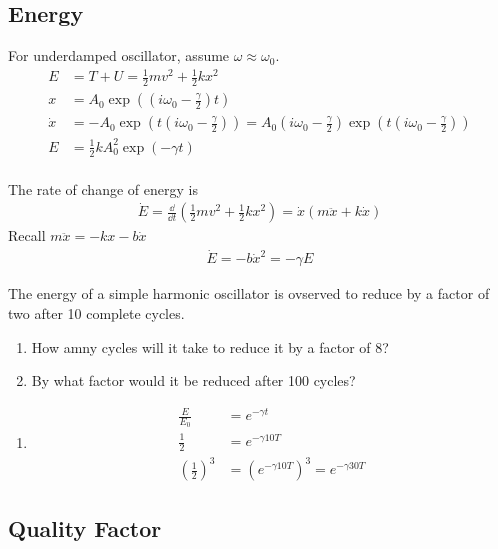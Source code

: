 \documentclass[a4paper]{article}
\numberwithin{equation}{section}
\begin{document}
\subsection{Energy}
For underdamped oscillator, assume $\omega\approx\omega_0$.
\begin{align}
    E&=T+U=\frac{1}{2}mv^2+\frac{1}{2}kx^2\\
    x&=A_0\exp((i\omega_0-\frac{\gamma}{2})t)\\
    \dot x&=-A_0\exp(t\left(i\omega_0-\frac{\gamma}{2}\right))=A_0\left(i\omega_0-\frac{\gamma}{2}\right)\exp(t\left(i\omega_0-\frac{\gamma}{2}\right))\\
    E&=\frac{1}{2}kA_0^2\exp(-\gamma t)\\
\end{align}

The rate of change of energy is 
\begin{align}
    \dot E=\frac{\dd}{\dd t}\left(\frac{1}{2}mv^2+\frac{1}{2}kx^2\right)=\dot x(m\ddot x+k\dot x)
\end{align}
Recall $m\ddot x=-kx-b\dot x$
\begin{align}
    \dot E=-b\dot x^2=-\gamma E 
\end{align}

\begin{example}
    The energy of a simple harmonic oscillator is ovserved to reduce by a factor of two after 10 complete cycles.
    \begin{enumerate}
        \item How amny cycles will it take to reduce it by a factor of 8?
        \item By what factor would it be reduced after 100 cycles?
    \end{enumerate}
\end{example}
\begin{sol}
    \begin{enumerate}
        \item \begin{align}
            \frac{E}{E_0}&=e^{-\gamma t}\\
            \frac{1}{2}&=e^{-\gamma 10 T}\\
            \left(\frac{1}{2}\right)^3&=\left(e^{-\gamma 10 T}\right)^3=e^{-\gamma 30 T}
        \end{align}
    \end{enumerate}
\end{sol}

\subsection{Quality Factor}
\end{document}
